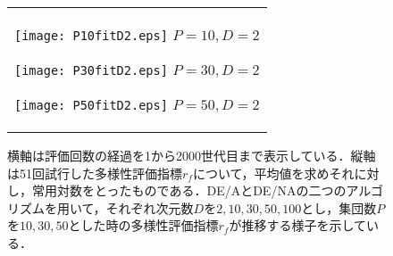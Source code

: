\documentclass[a4paper,11pt,oneside,openany]{jsbook}
\begin{document}
\newpage
\begin{figure}[htbp]
  \caption{横軸は評価回数の経過を1から2000世代目まで表示している．縦軸は51回試行した多様性評価指標$r_f$について，平均値を求めそれに対し，常用対数をとったものである．DE/AとDE/NAの二つのアルゴリズムを用いて，それぞれ次元数$D$を$2,10,30,50,100$とし，集団数$P$を$10,30,50$とした時の多様性評価指標$r_f$が推移する様子を示している．}
  \begin{center}
    \begin{tabular}{c}


      \begin{minipage}{0.33\hsize}
        \begin{center}
          \texttt{[image: P10fitD2.eps]}
          \hspace{1.2cm}$P=10, D=2
 $       \end{center}
      \end{minipage}

      \begin{minipage}{0.33\hsize}
        \begin{center}
          \texttt{[image: P30fitD2.eps]}
          \hspace{1.2cm}$P=30, D=2
 $       \end{center}
      \end{minipage}

      \begin{minipage}{0.33\hsize}
        \begin{center}
          \texttt{[image: P50fitD2.eps]}
          \hspace{1.2cm}$P=50, D=2
 $       \end{center}
      \end{minipage}
    \end{tabular}
  \end{center}
\end{figure}
\end{document}
